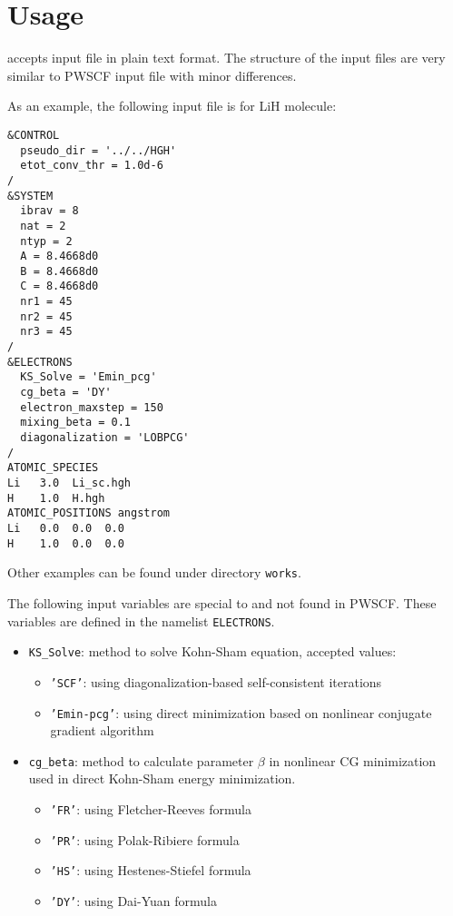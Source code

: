 \section{Usage}

\ffrmain accepts input file in plain text format.
The structure of the input files are very similar to PWSCF
input file with minor differences.

As an example, the following input file is for LiH molecule:
\begin{verbatim}
&CONTROL
  pseudo_dir = '../../HGH'
  etot_conv_thr = 1.0d-6
/
&SYSTEM
  ibrav = 8
  nat = 2
  ntyp = 2
  A = 8.4668d0
  B = 8.4668d0
  C = 8.4668d0
  nr1 = 45
  nr2 = 45
  nr3 = 45
/
&ELECTRONS
  KS_Solve = 'Emin_pcg'
  cg_beta = 'DY'
  electron_maxstep = 150
  mixing_beta = 0.1
  diagonalization = 'LOBPCG'
/
ATOMIC_SPECIES
Li   3.0  Li_sc.hgh
H    1.0  H.hgh
ATOMIC_POSITIONS angstrom
Li   0.0  0.0  0.0
H    1.0  0.0  0.0
\end{verbatim}

Other examples can be found under directory {\tt works}.

The following input variables are special to \ffrLFDFT
and not found in PWSCF. These variables are defined in
the namelist {\tt ELECTRONS}.

\begin{itemize}
\item {\tt KS\_Solve}: method to solve Kohn-Sham equation, accepted values:
\begin{itemize}
\item {\tt 'SCF'}: using diagonalization-based self-consistent iterations
\item {\tt 'Emin-pcg'}: using direct minimization based on nonlinear
conjugate gradient algorithm
\end{itemize}

\item {\tt cg\_beta}: method to calculate parameter $\beta$ in nonlinear CG minimization
used in direct Kohn-Sham energy minimization.
\begin{itemize}
\item {\tt 'FR'}: using Fletcher-Reeves formula
\item {\tt 'PR'}: using Polak-Ribiere formula
\item {\tt 'HS'}: using Hestenes-Stiefel formula
\item {\tt 'DY'}: using Dai-Yuan formula
\end{itemize}

\end{itemize}


